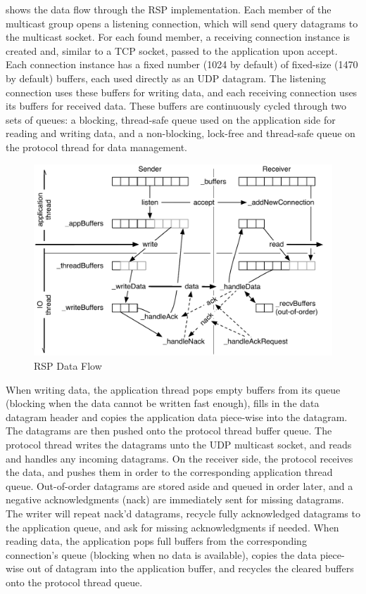  shows the data flow through the RSP implementation. Each member of
the multicast group opens a listening connection, which will send query
datagrams to the multicast socket. For each found member, a receiving
connection instance is created and, similar to a TCP socket, passed to the
application upon \textsf{accept}. Each connection instance has a fixed number
(1024 by default) of fixed-size (1470 by default) buffers, each used directly
as an UDP datagram. The listening connection uses these buffers for writing
data, and each receiving connection uses its buffers for received data. These
buffers are continuously cycled through two sets of queues: a blocking,
thread-safe queue used on the application side for reading and writing data,
and a non-blocking, lock-free and thread-safe queue on the protocol thread for
data management.

\begin{figure}[h!t]\center
  \includegraphics[width=\textwidth]{images/rspPackets.pdf}
  {\caption{\label{fRSP}RSP Data Flow}}
\end{figure}

When writing data, the application thread pops empty buffers from its queue
(blocking when the data cannot be written fast enough), fills in the
\textsf{data} datagram header and copies the application data piece-wise into
the datagram. The datagrams are then pushed onto the protocol thread buffer
queue. The protocol thread writes the datagrams unto the UDP multicast socket,
and reads and handles any incoming datagrams. On the receiver side, the protocol
receives the data, and pushes them in order to the corresponding application
thread queue. Out-of-order datagrams are stored aside and queued in order later,
and a negative acknowledgments (nack) are immediately sent for missing
datagrams. The writer will repeat nack'd datagrams, recycle fully acknowledged
datagrams to the application queue, and ask for missing acknowledgments if
needed. When reading data, the application pops full buffers from the
corresponding connection's queue (blocking when no data is available), copies
the data piece-wise out of datagram into the application buffer, and recycles
the cleared buffers onto the protocol thread queue.

